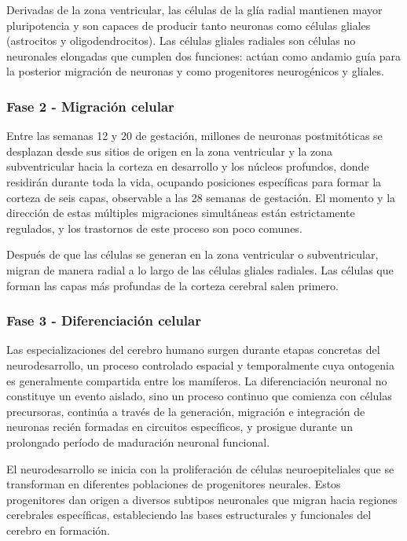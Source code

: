 \documentclass[11pt,letterpaper]{report}
\begin{document}
Derivadas de la zona ventricular, las células de la glía radial mantienen mayor
pluripotencia y son capaces de producir tanto neuronas como células gliales
(astrocitos y oligodendrocitos). Las células gliales radiales son células no
neuronales elongadas que cumplen dos funciones: actúan como andamio guía para
la posterior migración de neuronas y como progenitores neurogénicos y gliales.
\cite{Polin124}

\subsubsection{Fase 2 - Migración celular}
Entre las semanas 12 y 20 de gestación, millones de neuronas postmitóticas se
desplazan desde sus sitios de origen en la zona ventricular y la zona
subventricular hacia la corteza en desarrollo y los núcleos profundos, donde
residirán durante toda la vida, ocupando posiciones específicas para formar la
corteza de seis capas, observable a las 28 semanas de gestación. El momento y
la dirección de estas múltiples migraciones simultáneas están estrictamente
regulados, y los trastornos de este proceso son poco comunes.
\cite{Polin124}

Después de que las células se generan en la zona ventricular o subventricular,
migran de manera radial a lo largo de las células gliales radiales. Las células
que forman las capas más profundas de la corteza cerebral salen primero. 
\cite{Polin124}

\subsubsection{Fase 3 - Diferenciación celular}
Las especializaciones del cerebro humano surgen durante etapas concretas del
neurodesarrollo, un proceso controlado espacial y temporalmente cuya
ontogenia es generalmente compartida entre los mamíferos. La diferenciación
neuronal no constituye un evento aislado, sino un proceso continuo que comienza
con células precursoras, continúa a través de la generación, migración e
integración de neuronas recién formadas en circuitos específicos, y prosigue
durante un prolongado período de maduración neuronal funcional.
\cite{Lindhout2024}

El neurodesarrollo se inicia con la proliferación de células neuroepiteliales
que se transforman en diferentes poblaciones de progenitores neurales. Estos
progenitores dan origen a diversos subtipos neuronales que migran hacia
regiones cerebrales específicas, estableciendo las bases estructurales y
funcionales del cerebro en formación. \cite{Lindhout2024}
\end{document}
